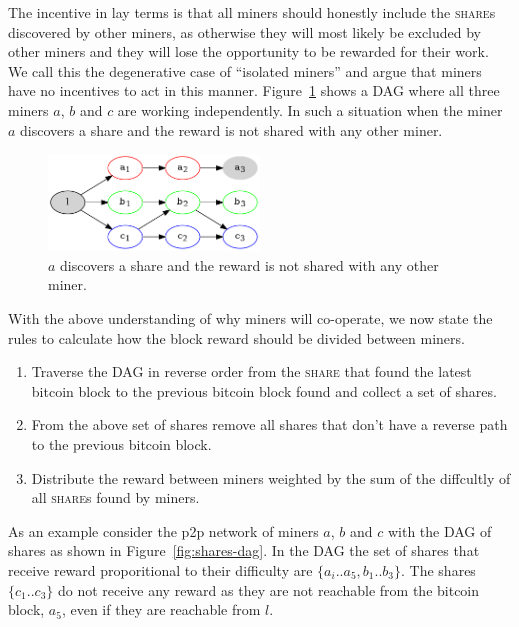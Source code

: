 \documentclass{article}
\begin{document}
The incentive in lay terms is that all miners should honestly include
the \textsc{share}s discovered by other miners, as otherwise they will
most likely be excluded by other miners and they will lose the
opportunity to be rewarded for their work. We call this the
degenerative case of ``isolated miners'' and argue that miners have no
incentives to act in this manner. Figure~\ref{fig:isolated-miners}
shows a DAG where all three miners $a$, $b$ and $c$ are working
independently. In such a situation when the miner $a$ discovers a
share and the reward is not shared with any other miner.

\begin{figure}[h]
  \begin{center}
    \includegraphics[width=0.5\textwidth]{isolated-miners}
    \caption{$a$ discovers a share and the reward is not shared with any
      other miner.}\label{fig:isolated-miners}
  \end{center}    
\end{figure}

With the above understanding of why miners will co-operate, we now
state the rules to calculate how the block reward should be divided
between miners.

\begin{enumerate}
  \item Traverse the DAG in reverse order from the \textsc{share} that
    found the latest bitcoin block to the previous bitcoin block found
    and collect a set of shares.
  \item From the above set of shares remove all shares that don't have
    a reverse path to the previous bitcoin block.
  \item Distribute the reward between miners weighted by the sum of
    the diffcultly of all \textsc{share}s found by miners.
\end{enumerate}

As an example consider the p2p network of miners $a$, $b$ and $c$ with
the DAG of shares as shown in Figure~\ref{fig:shares-dag}. In the DAG
the set of shares that receive reward proporitional to their
difficulty are $\{a_i..a_5, b_1..b_3\}$. The shares $\{c_1..c_3\}$ do
not receive any reward as they are not reachable from the bitcoin
block, $a_5$, even if they are reachable from $l$.
\end{document}

